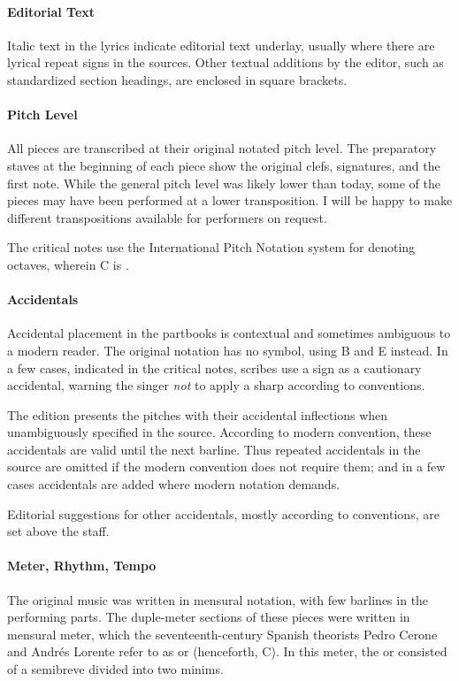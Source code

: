 \paragraph{Editorial Text}
Italic text in the lyrics indicate editorial text underlay, usually where there are lyrical repeat signs in the sources.
Other textual additions by the editor, such as standardized section headings, are enclosed in square brackets.

\paragraph{Pitch Level}
All pieces are transcribed at their original notated pitch level.
The preparatory staves at the beginning of each piece show the original clefs, signatures, and the first note.
While the  general pitch level was likely lower than today, some of the pieces may have been performed at a lower transposition.
I will be happy to make different transpositions available for performers on request.

The critical notes use the International Pitch Notation system for denoting octaves, wherein C is .



\paragraph{Accidentals}
Accidental placement in the partbooks is contextual and sometimes ambiguous to a modern reader.
The original notation has no \na{} symbol, using B\sh{} and E\sh{} instead.
In a few cases, indicated in the critical notes, scribes use a \sh{} sign as a cautionary accidental, warning the singer \emph{not} to apply a sharp according to  conventions.%
  \autocites{Harran:Cautionary1}{Harran:Cautionary2}

The edition presents the pitches with their accidental inflections when unambiguously specified in the source.
According to modern convention, these accidentals are valid until the next barline.
Thus repeated accidentals in the source are omitted if the modern convention does not require them; and in a few cases accidentals are added where modern notation demands.

Editorial suggestions for other accidentals, mostly according to  conventions, are set above the staff.

\paragraph{Meter, Rhythm, Tempo}
The original music was written in mensural notation, with few barlines in the performing parts. 
The duple-meter sections of these pieces were written in mensural \meterC{} meter, which the seventeenth-century Spanish theorists Pedro Cerone and Andrés Lorente refer to as  or  (henceforth, C).%
  \autocites[537]{Cerone:Melopeo}[156, 210]{Lorente:Porque}
In this meter, the  or  consisted of a semibreve divided into two minims.%
  \autocites{GonzalezValle:MusicaTexto}{GonzalezValle:CompasCabezon}

